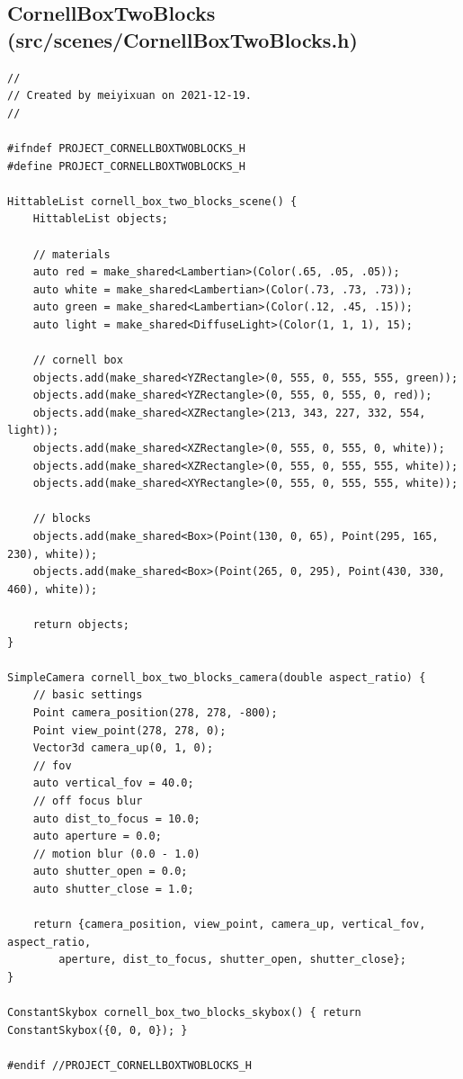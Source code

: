 \documentclass[utf8]{article}
\begin{document}
\subsection{CornellBoxTwoBlocks (src/scenes/CornellBoxTwoBlocks.h)}
\begin{lstlisting}[style=CStyle]
//
// Created by meiyixuan on 2021-12-19.
//

#ifndef PROJECT_CORNELLBOXTWOBLOCKS_H
#define PROJECT_CORNELLBOXTWOBLOCKS_H

HittableList cornell_box_two_blocks_scene() {
	HittableList objects;
	
	// materials
	auto red = make_shared<Lambertian>(Color(.65, .05, .05));
	auto white = make_shared<Lambertian>(Color(.73, .73, .73));
	auto green = make_shared<Lambertian>(Color(.12, .45, .15));
	auto light = make_shared<DiffuseLight>(Color(1, 1, 1), 15);
	
	// cornell box
	objects.add(make_shared<YZRectangle>(0, 555, 0, 555, 555, green));
	objects.add(make_shared<YZRectangle>(0, 555, 0, 555, 0, red));
	objects.add(make_shared<XZRectangle>(213, 343, 227, 332, 554, light));
	objects.add(make_shared<XZRectangle>(0, 555, 0, 555, 0, white));
	objects.add(make_shared<XZRectangle>(0, 555, 0, 555, 555, white));
	objects.add(make_shared<XYRectangle>(0, 555, 0, 555, 555, white));
	
	// blocks
	objects.add(make_shared<Box>(Point(130, 0, 65), Point(295, 165, 230), white));
	objects.add(make_shared<Box>(Point(265, 0, 295), Point(430, 330, 460), white));
	
	return objects;
}

SimpleCamera cornell_box_two_blocks_camera(double aspect_ratio) {
	// basic settings
	Point camera_position(278, 278, -800);
	Point view_point(278, 278, 0);
	Vector3d camera_up(0, 1, 0);
	// fov
	auto vertical_fov = 40.0;
	// off focus blur
	auto dist_to_focus = 10.0;
	auto aperture = 0.0;
	// motion blur (0.0 - 1.0)
	auto shutter_open = 0.0;
	auto shutter_close = 1.0;
	
	return {camera_position, view_point, camera_up, vertical_fov, aspect_ratio,
		aperture, dist_to_focus, shutter_open, shutter_close};
}

ConstantSkybox cornell_box_two_blocks_skybox() { return ConstantSkybox({0, 0, 0}); }

#endif //PROJECT_CORNELLBOXTWOBLOCKS_H

\end{lstlisting}
\end{document}
